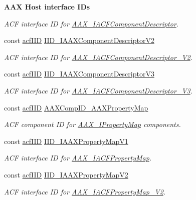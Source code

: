 \begin{Indent}{\bf A\+A\+X Host interface I\+Ds}
\begin{DoxyCompactItemize}
\begin{DoxyCompactList}\small\item\em A\+C\+F interface I\+D for \hyperlink{a00050}{A\+A\+X\+\_\+\+I\+A\+C\+F\+Component\+Descriptor}. \end{DoxyCompactList}\item 
const \hyperlink{a00150_a59df0b41744eee7a066787aaedf97f67}{acf\+I\+I\+D} \hyperlink{a00299_a1d39a90fada901d3d0a384324e79dde5}{I\+I\+D\+\_\+\+I\+A\+A\+X\+Component\+Descriptor\+V2}
\begin{DoxyCompactList}\small\item\em A\+C\+F interface I\+D for \hyperlink{a00051}{A\+A\+X\+\_\+\+I\+A\+C\+F\+Component\+Descriptor\+\_\+\+V2}. \end{DoxyCompactList}\item 
const \hyperlink{a00150_a59df0b41744eee7a066787aaedf97f67}{acf\+I\+I\+D} \hyperlink{a00299_a4cc4d308ddb1baa7a91f6ac35151987e}{I\+I\+D\+\_\+\+I\+A\+A\+X\+Component\+Descriptor\+V3}
\begin{DoxyCompactList}\small\item\em A\+C\+F interface I\+D for \hyperlink{a00052}{A\+A\+X\+\_\+\+I\+A\+C\+F\+Component\+Descriptor\+\_\+\+V3}. \end{DoxyCompactList}\item 
const \hyperlink{a00150_a59df0b41744eee7a066787aaedf97f67}{acf\+I\+I\+D} \hyperlink{a00299_a83d2267df335ec2976f28c1739252da0}{A\+A\+X\+Comp\+I\+D\+\_\+\+A\+A\+X\+Property\+Map}
\begin{DoxyCompactList}\small\item\em A\+C\+F component I\+D for \hyperlink{a00112}{A\+A\+X\+\_\+\+I\+Property\+Map} components. \end{DoxyCompactList}\item 
const \hyperlink{a00150_a59df0b41744eee7a066787aaedf97f67}{acf\+I\+I\+D} \hyperlink{a00299_a6f1eedd8a2328492efa7a357565b8e2d}{I\+I\+D\+\_\+\+I\+A\+A\+X\+Property\+Map\+V1}
\begin{DoxyCompactList}\small\item\em A\+C\+F interface I\+D for \hyperlink{a00079}{A\+A\+X\+\_\+\+I\+A\+C\+F\+Property\+Map}. \end{DoxyCompactList}\item 
const \hyperlink{a00150_a59df0b41744eee7a066787aaedf97f67}{acf\+I\+I\+D} \hyperlink{a00299_a39b9cbfe4f60ec41bb43be35e3d4d568}{I\+I\+D\+\_\+\+I\+A\+A\+X\+Property\+Map\+V2}
\begin{DoxyCompactList}\small\item\em A\+C\+F interface I\+D for \hyperlink{a00080}{A\+A\+X\+\_\+\+I\+A\+C\+F\+Property\+Map\+\_\+\+V2}. \end{DoxyCompactList}\item 

\end{DoxyCompactItemize}
\end{Indent}
